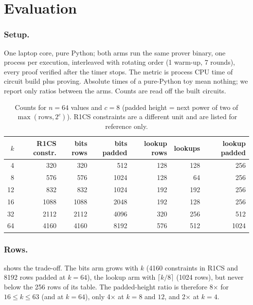 \section{Evaluation}\label{sec:eval}

\subsubsection{Setup.} One laptop core, pure Python; both arms run the same prover binary, one process per
execution, interleaved with rotating order (1 warm-up, 7 rounds), every proof verified after the timer stops. %
The metric is process CPU time of circuit build plus proving. Absolute times of a pure-Python toy mean nothing;
we report only ratios between the arms. Counts are read off the built circuits.

\begin{table}[t]
\centering
\caption{Counts for $n = 64$ values and $c = 8$ (padded height = next power of two of $\max(\text{rows}, 2^c)$).
R1CS constraints are a different unit and are listed for reference only.}\label{tab:counts}
\begin{tabular}{rrrrrrr}
\toprule
$k$ & R1CS constr. & bits rows & bits padded & lookup rows & lookups & lookup padded \\
\midrule
4  & 320  & 320  & 512  & 128 & 128 & 256 \\
8  & 576  & 576  & 1024 & 128 & 64  & 256 \\
12 & 832  & 832  & 1024 & 192 & 192 & 256 \\
16 & 1088 & 1088 & 2048 & 192 & 128 & 256 \\
32 & 2112 & 2112 & 4096 & 320 & 256 & 512 \\
64 & 4160 & 4160 & 8192 & 576 & 512 & 1024 \\
\bottomrule
\end{tabular}
\end{table}

\subsubsection{Rows.}  shows the trade-off. The bits arm grows with $k$ (4160 constraints
in R1CS and 8192 rows padded at $k = 64$), the lookup arm with $\lceil k/8 \rceil$ (1024 rows), but
never below the 256 rows of its table. The padded-height ratio is therefore 8$\times$ for
$16 \le k \le 63$ (and at $k = 64$), only 4$\times$ at $k = 8$ and $12$, and 2$\times$ at $k = 4$.

